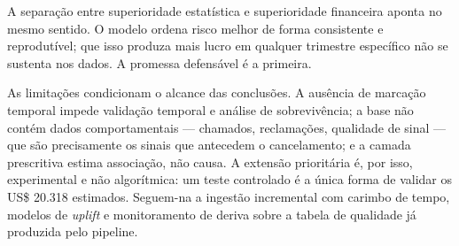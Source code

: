 \documentclass[10pt,a4paper]{article}
\begin{document}
A separação entre superioridade estatística e superioridade financeira aponta no mesmo
sentido. O modelo ordena risco melhor de forma consistente e reprodutível; que isso
produza mais lucro em qualquer trimestre específico não se sustenta nos dados. A promessa
defensável é a primeira.

As limitações condicionam o alcance das conclusões. A ausência de marcação temporal impede
validação temporal e análise de sobrevivência; a base não contém dados comportamentais ---
chamados, reclamações, qualidade de sinal --- que são precisamente os sinais que antecedem o
cancelamento; e a camada prescritiva estima associação, não causa. A extensão prioritária é, por
isso, experimental e não algorítmica: um teste controlado é a única forma de validar os
US\$ 20.318 estimados. Seguem-na a ingestão incremental com carimbo de tempo, modelos de
\emph{uplift} e monitoramento de deriva sobre a tabela de qualidade já produzida pelo pipeline.
\end{document}
